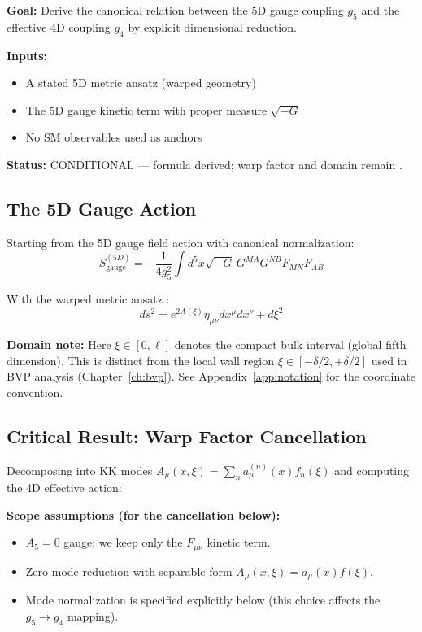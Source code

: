 \begin{tcolorbox}[edcGuardrail, title=\textbf{Epistemic Status: OPR-19}]
\textbf{Goal:} Derive the canonical relation between the 5D gauge coupling $g_5$
and the effective 4D coupling $g_4$ by explicit dimensional reduction.

\textbf{Inputs:}
\begin{itemize}[nosep]
    \item A stated 5D metric ansatz (warped geometry) \tagP{}
    \item The 5D gauge kinetic term with proper measure $\sqrt{-G}$
    \item No SM observables used as anchors
\end{itemize}

\textbf{Status:} CONDITIONAL \tagDc{} --- formula derived; warp factor and domain remain \tagP{}.
\end{tcolorbox}

\subsection{The 5D Gauge Action}

Starting from the 5D gauge field action with canonical normalization:
\begin{equation}
    S_{\text{gauge}}^{(5D)} = -\frac{1}{4g_5^2} \int d^5x \sqrt{-G} \,
    G^{MA} G^{NB} F_{MN} F_{AB}
    \label{eq:opr19_action}
\end{equation}

With the warped metric ansatz \tagP{}:
\begin{equation}
    ds^2 = e^{2A(\xi)} \eta_{\mu\nu} dx^\mu dx^\nu + d\xi^2
    \label{eq:opr19_metric}
\end{equation}

\textbf{Domain note:} Here $\xi \in [0, \ell]$ denotes the compact bulk interval
(global fifth dimension). This is distinct from the local wall region
$\xi \in [-\delta/2, +\delta/2]$ used in BVP analysis (Chapter~\ref{ch:bvp}).
See Appendix~\ref{app:notation} for the coordinate convention.

\subsection{Critical Result: Warp Factor Cancellation}

Decomposing into KK modes $A_\mu(x,\xi) = \sum_n a_\mu^{(n)}(x) f_n(\xi)$ and
computing the 4D effective action:

\textbf{Scope assumptions (for the cancellation below):}
\begin{itemize}[nosep]
\item $A_5 = 0$ gauge; we keep only the $F_{\mu\nu}$ kinetic term.
\item Zero-mode reduction with separable form $A_\mu(x,\xi)=a_\mu(x)f(\xi)$.
\item Mode normalization is specified explicitly below (this choice affects the $g_5 \to g_4$ mapping).
\end{itemize}

